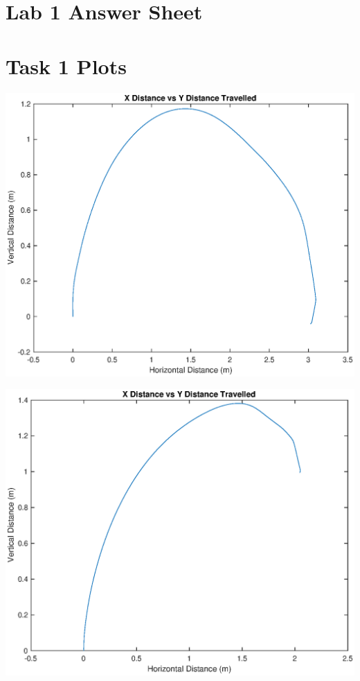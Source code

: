 \documentclass[10pt]{article}
\newcommand{\bigScale}{0.6}
\begin{document}
\pagebreak
\section{Lab 1 Answer Sheet}


\pagebreak
\section{Task 1 Plots}
\centering
\includegraphics[scale=\bigScale]{./figures/task1_x0_y3.eps}

\includegraphics[scale=\bigScale]{./figures/task1_x1y2.eps}
\end{document}
